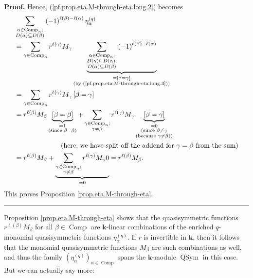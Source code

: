 \documentclass[numbers=enddot,12pt,final,onecolumn,notitlepage]{scrartcl}%
\theoremstyle{definition}
\newenvironment{proof}[1][Proof]{\noindent\textbf{#1.} }{\ \rule{0.5em}{0.5em}}
\let\sumnonlimits\sum
\renewcommand{\sum}{\sumnonlimits\limits}
\newenvironment{verlong}{}{}
\begin{document}
\begin{verlong}
\begin{proof}
Hence, (\ref{pf.prop.eta.M-through-eta.long.2}) becomes%
\begin{align*}
&  \sum_{\substack{\alpha\in\operatorname*{Comp}\nolimits_{n};\\D\left(
\alpha\right)  \subseteq D\left(  \beta\right)  }}\left(  -1\right)
^{\ell\left(  \beta\right)  -\ell\left(  \alpha\right)  }\eta_{\alpha
}^{\left(  q\right)  }\\
&  =\sum_{\gamma\in\operatorname*{Comp}\nolimits_{n}}r^{\ell\left(
\gamma\right)  }M_{\gamma}\underbrace{\sum_{\substack{\alpha\in
\operatorname*{Comp}\nolimits_{n};\\D\left(  \gamma\right)  \subseteq D\left(
\alpha\right)  ;\\D\left(  \alpha\right)  \subseteq D\left(  \beta\right)
}}\left(  -1\right)  ^{\ell\left(  \beta\right)  -\ell\left(  \alpha\right)
}}_{\substack{=\left[  \beta=\gamma\right]  \\\text{(by
(\ref{pf.prop.eta.M-through-eta.long.3}))}}}\\
&  =\sum_{\gamma\in\operatorname*{Comp}\nolimits_{n}}r^{\ell\left(
\gamma\right)  }M_{\gamma}\left[  \beta=\gamma\right] \\
&  =r^{\ell\left(  \beta\right)  }M_{\beta}\underbrace{\left[  \beta
=\beta\right]  }_{\substack{=1\\\text{(since }\beta=\beta\text{)}}%
}+\sum_{\substack{\gamma\in\operatorname*{Comp}\nolimits_{n};\\\gamma\neq
\beta}}r^{\ell\left(  \gamma\right)  }M_{\gamma}\underbrace{\left[
\beta=\gamma\right]  }_{\substack{=0\\\text{(since }\beta\neq\gamma
\\\text{(because }\gamma\neq\beta\text{))}}}\\
&  \ \ \ \ \ \ \ \ \ \ \ \ \ \ \ \ \ \ \ \ \left(  \text{here, we have split
off the addend for }\gamma=\beta\text{ from the sum}\right) \\
&  =r^{\ell\left(  \beta\right)  }M_{\beta}+\underbrace{\sum_{\substack{\gamma
\in\operatorname*{Comp}\nolimits_{n};\\\gamma\neq\beta}}r^{\ell\left(
\gamma\right)  }M_{\gamma}0}_{=0}=r^{\ell\left(  \beta\right)  }M_{\beta}.
\end{align*}
This proves Proposition \ref{prop.eta.M-through-eta}.
\end{proof}
\end{verlong}

Proposition \ref{prop.eta.M-through-eta} shows that the quasisymmetric
functions $r^{\ell\left(  \beta\right)  }M_{\beta}$ for all $\beta
\in\operatorname*{Comp}$ are $\mathbf{k}$-linear combinations of the enriched
$q$-monomial quasisymmetric functions $\eta_{\alpha}^{\left(  q\right)  }$. If
$r$ is invertible in $\mathbf{k}$, then it follows that the monomial
quasisymmetric functions $M_{\beta}$ are such combinations as well, and thus
the family $\left(  \eta_{\alpha}^{\left(  q\right)  }\right)  _{\alpha
\in\operatorname*{Comp}}$ spans the $\mathbf{k}$-module $\operatorname*{QSym}$
in this case. But we can actually say more:
\end{document}
